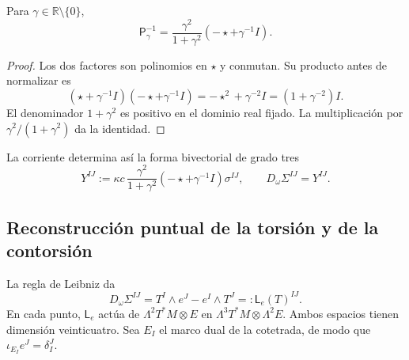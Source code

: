 \begin{lemma}
\label{vii:lem:inversa-holst}
Para \(\gamma\in\mathbb R\setminus\{0\}\),
\begin{equation}
 \mathsf P_\gamma^{-1}
 =\frac{\gamma^2}{1+\gamma^2}
                      (-\star+\gamma^{-1}I).
 \label{vii:eq:inversa-holst}
\end{equation}
\end{lemma}
\begin{proof}
Los dos factores son polinomios en \(\star\) y conmutan. Su producto
antes de normalizar es
\[
 (\star+\gamma^{-1}I)(-\star+\gamma^{-1}I)
 =-\star^2+\gamma^{-2}I=(1+\gamma^{-2})I.
\]
El denominador \(1+\gamma^2\) es positivo en el dominio real fijado.
La multiplicación por \(\gamma^2/(1+\gamma^2)\) da la identidad.
\end{proof}

La corriente determina así la forma bivectorial de grado tres
\begin{equation}
 Y^{IJ}:=\kappa c\,
   \frac{\gamma^2}{1+\gamma^2}
   (-\star+\gamma^{-1}I)\sigma^{IJ},
 \qquad D_\omega\Sigma^{IJ}=Y^{IJ}.
 \label{vii:eq:corriente-dualizada}
\end{equation}

\subsection{Reconstrucción puntual de la torsión y de la contorsión}
\label{vii:subsec:reconstruccion-torsion}

La regla de Leibniz da
\begin{equation}
 D_\omega\Sigma^{IJ}
 =T^I\wedge e^J-e^I\wedge T^J
 =:\mathsf L_e(T)^{IJ}.
 \label{vii:eq:mapa-torsion}
\end{equation}
En cada punto, \(\mathsf L_e\) actúa de
\(\Lambda^2T^*M\otimes E\) en
\(\Lambda^3T^*M\otimes\Lambda^2E\). Ambos espacios tienen dimensión
veinticuatro. Sea \(E_I\) el marco dual de la cotetrada, de modo que
\(\iota_{E_I}e^J=\delta_I^J\).

